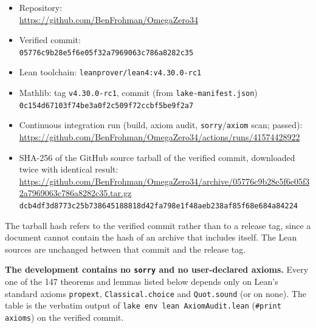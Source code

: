 \documentclass[11pt,a4paper]{article}
\theoremstyle{definition}
\theoremstyle{remark}
\begin{document}
{\raggedright
\begin{itemize}
\item Repository:\\ {\footnotesize\url{https://github.com/BenFrohman/OmegaZero34}}
\item Verified commit:\\ {\footnotesize\texttt{05776c9b28e5f6e05f32a7969063c786a8282c35}}
\item Lean toolchain: \texttt{leanprover/lean4:v4.30.0-rc1}
\item Mathlib: tag \texttt{v4.30.0-rc1}, commit (from \texttt{lake-manifest.json})\\ {\footnotesize\texttt{0c154d67103f74be3a0f2c509f72ccbf5be9f2a7}}
\item Continuous integration run (build, axiom audit, \texttt{sorry}/\texttt{axiom} scan; passed):\\ {\footnotesize\url{https://github.com/BenFrohman/OmegaZero34/actions/runs/41574428922}}
\item SHA-256 of the GitHub source tarball of the verified commit, downloaded twice with identical result:\\ {\footnotesize\url{https://github.com/BenFrohman/OmegaZero34/archive/05776c9b28e5f6e05f32a7969063c786a8282c35.tar.gz}}\\
{\footnotesize\texttt{dcb4df3d8773c25b738645188818d42fa798e1f48aeb238af85f68e684a84224}}
\end{itemize}\par}

The tarball hash refers to the verified commit rather than to a release tag, since a document cannot contain the hash of an archive that includes itself. The Lean sources are unchanged between that commit and the release tag.

\textbf{The development contains no \texttt{sorry} and no user-declared axioms.} Every one of the 147 theorems and lemmas listed below depends only on Lean's standard axioms \texttt{propext}, \texttt{Classical.choice} and \texttt{Quot.sound} (or on none). The table is the verbatim output of \texttt{lake env lean AxiomAudit.lean} (\texttt{\#print axioms}) on the verified commit.
\end{document}
